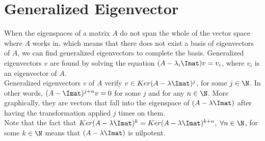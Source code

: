 \section*{Generalized Eigenvector}

When the eigenspaces of a matrix $A$ do not span the whole of the vector space where $A$ works in, which means that there does not exist a basis of eigenvectors of $A$, we can find generalized eigenvectors to complete the basis. Generalized eigenvectors $v$ are found by solving the equation $(A-\lambda_i\Imat)v=v_i$, where $v_i$ is an eigenvector of $A$.\\

Generalized eigenvectors $v$ of $A$ verify $v \in Ker(A-\lambda\Imat)^j$, for some $j\in \N$. In other words, $(A-\Imat)^{j+n}v=0$ for some $j$ and for any $n\in \N$. More graphically, they are vectors that fall into the eigenspace of $(A-\lambda\Imat)$ after having the transformation applied $j$ times on them.\\

Note that the fact that $Ker(A-\lambda\Imat)^k=Ker(A-\lambda\Imat)^{k+n},\;\forall n\in \N$, for some $k\in \N$ means that $(A-\lambda\Imat)$ is nilpotent.